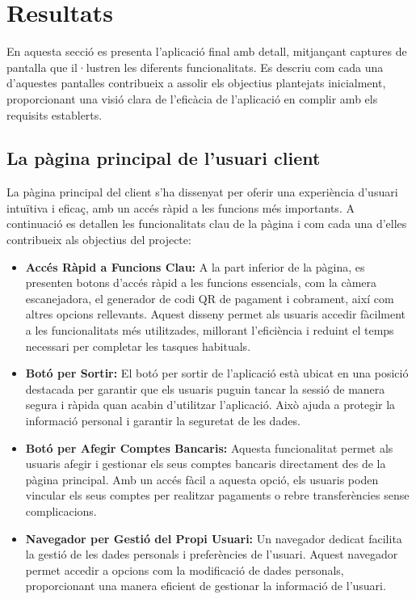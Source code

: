 \documentclass[a4paper,12pt,twoside]{ThesisStyle}
\begin{document}
\section{Resultats}
\label{sec: Resultats}

En aquesta secció es presenta l'aplicació final amb detall, mitjançant captures de pantalla que il·lustren les diferents funcionalitats. Es descriu com cada una d'aquestes pantalles contribueix a assolir els objectius plantejats inicialment, proporcionant una visió clara de l'eficàcia de l'aplicació en complir amb els requisits establerts.

\subsection{La pàgina principal de l'usuari client}
\label{subsec: La pàgina principal de l'usuari client}

La pàgina principal del client s'ha dissenyat per oferir una experiència d'usuari intuïtiva i eficaç, amb un accés ràpid a les funcions més importants. A continuació es detallen les funcionalitats clau de la pàgina i com cada una d'elles contribueix als objectius del projecte:

\begin{itemize}
    \item \textbf{Accés Ràpid a Funcions Clau:} A la part inferior de la pàgina, es presenten botons d'accés ràpid a les funcions essencials, com la càmera escanejadora, el generador de codi QR de pagament i cobrament, així com altres opcions rellevants. Aquest disseny permet als usuaris accedir fàcilment a les funcionalitats més utilitzades, millorant l'eficiència i reduint el temps necessari per completar les tasques habituals.
    
    \item \textbf{Botó per Sortir:} El botó per sortir de l'aplicació està ubicat en una posició destacada per garantir que els usuaris puguin tancar la sessió de manera segura i ràpida quan acabin d'utilitzar l'aplicació. Això ajuda a protegir la informació personal i garantir la seguretat de les dades.
    
    \item \textbf{Botó per Afegir Comptes Bancaris:} Aquesta funcionalitat permet als usuaris afegir i gestionar els seus comptes bancaris directament des de la pàgina principal. Amb un accés fàcil a aquesta opció, els usuaris poden vincular els seus comptes per realitzar pagaments o rebre transferències sense complicacions.
    
    \item \textbf{Navegador per Gestió del Propi Usuari:} Un navegador dedicat facilita la gestió de les dades personals i preferències de l'usuari. Aquest navegador permet accedir a opcions com la modificació de dades personals, proporcionant una manera eficient de gestionar la informació de l'usuari.
\end{itemize}
\end{document}
